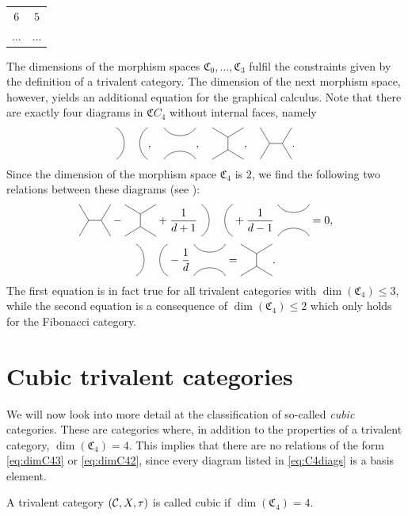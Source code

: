 \begin{exmp}
\begin{table}[H]
\begin{tabular}{c|c}
				$6$ & $5$\\
				$\dots$ & $\dots$
			\end{tabular}
		\end{table}
	\noindent
	The dimensions of the morphism spaces $\mathfrak{C}_0,\dots,\mathfrak{C}_3$ fulfil the constraints given by the definition of a trivalent category. The dimension of the next morphism space, however, yields an additional equation for the graphical calculus. Note that there are exactly four diagrams in $\mathfrak{C}C_4$ without internal faces, namely 
		\begin{equation}
		\label{eq:C4diags}
			\Cfourone,\hspace{10pt}
			\Cfourtwo,\hspace{10pt}
			\Cfourthree,\hspace{10pt}
			\Cfourfour.
		\end{equation}
	Since the dimension of the morphism space $\mathfrak{C}_4$ is $2$, we find the following two relations between these diagrams (see \cite{Morrison2017}):
		\begin{equation}
		\label{eq:dimC43}
			\Cfourfour-\Cfourthree+\frac{1}{d+1}\ \Cfourone+\frac{1}{d-1}\ \Cfourtwo=0,
		\end{equation}
		\begin{equation}
		\label{eq:dimC42}
			\Cfourone-\frac{1}{d}\ \Cfourtwo=\Cfourthree.
		\end{equation}
	The first equation is in fact true for all trivalent categories with $\dim(\mathfrak{C}_4)\le 3$, while the second equation is a consequence of $\dim(\mathfrak{C}_4)\le 2$ which only holds for the Fibonacci category.
\end{exmp}


\section{Cubic trivalent categories} 
\label{sec:cubictriv}

We will now look into more detail at the classification of so-called \emph{cubic} categories. These are categories where, in addition to the properties of a trivalent category, $\dim(\mathfrak{C}_4)=4$. This implies that there are no relations of the form \cref{eq:dimC43} or \cref{eq:dimC42}, since every diagram listed in \cref{eq:C4diags} is a basis element.

	\begin{defn}
		A trivalent category $({\mathcal{C}},X,\tau)$ is called cubic if $\dim(\mathfrak{C}_4)=4$.
	\end{defn}


